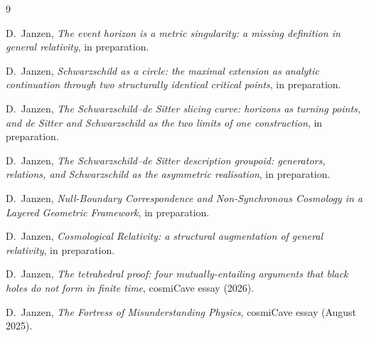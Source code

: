 \documentclass[11pt,a4paper]{article}
\begin{document}
\bigskip

\begin{thebibliography}{9}

D.~Janzen,
\emph{The event horizon is a metric singularity: a missing definition in general relativity},
in preparation.

D.~Janzen,
\emph{Schwarzschild as a circle: the maximal extension as analytic continuation through two structurally identical critical points},
in preparation.

D.~Janzen,
\emph{The Schwarzschild--de Sitter slicing curve: horizons as turning points, and de Sitter and Schwarzschild as the two limits of one construction},
in preparation.

D.~Janzen,
\emph{The Schwarzschild--de Sitter description groupoid: generators, relations, and Schwarzschild as the asymmetric realisation},
in preparation.

D.~Janzen,
\emph{Null-Boundary Correspondence and Non-Synchronous Cosmology in a Layered Geometric Framework},
in preparation.

D.~Janzen,
\emph{Cosmological Relativity: a structural augmentation of general relativity},
in preparation.

D.~Janzen,
\emph{The tetrahedral proof: four mutually-entailing arguments that black holes do not form in finite time},
cosmiCave essay (2026).

D.~Janzen,
\emph{The Fortress of Misunderstanding Physics},
cosmiCave essay (August 2025).

\end{thebibliography}
\end{document}

